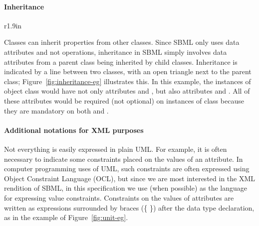 \paragraph{Inheritance}

\begin{wrapfigure}[18]{r}{1.9in}
  \centering
  \small
  \vspace*{-7ex}
  \caption{Inheritance.}
  \label{fig:inheritance-eg}
\end{wrapfigure}
Classes can inherit properties from other classes.  Since SBML
only uses data attributes and not operations, inheritance in SBML
simply involves data attributes from a parent class being
inherited by child classes.  Inheritance is indicated by a line
between two classes, with an open triangle next to the parent
class; Figure~\ref{fig:inheritance-eg} illustrates this.  In this
example, the instances of object class  would have
not only attributes  and , but also attributes
 and .  All of these attributes would be
required (not optional) on instances of class 
because they are mandatory on both  and
.



\paragraph{Additional notations for XML purposes}

Not everything is easily expressed in plain UML.  For example, it
is often necessary to indicate some constraints placed on the
values of an attribute.  In computer programming uses of UML, such
constraints are often expressed using Object Constraint Language
(OCL), but since we are most interested in the XML rendition of
SBML, in this specification we use \xmlschemaone (when possible)
as the language for expressing value constraints.  Constraints on
the values of attributes are written as expressions surrounded by
braces (\{ \}) after the data type declaration, as in the example
of Figure~\ref{fig:unit-eg}.

